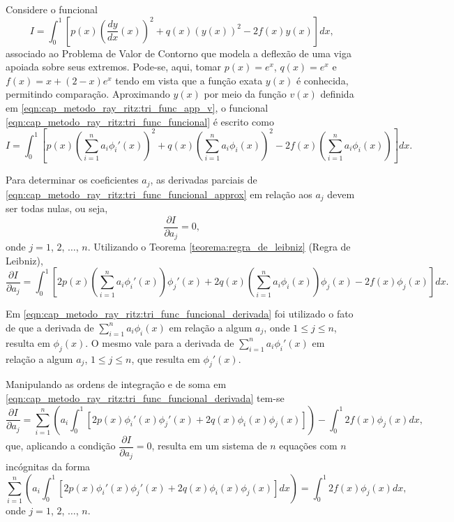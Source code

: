 \documentclass[
	12pt,				%
	openright,			%
    twoside,			%
	a4paper,			%
	english,			%
	french,				%
	spanish,			%
	brazil				%
	]{abntex2}
\numberwithin{lema}{chapter}
\numberwithin{teorema}{chapter}
\numberwithin{definicao}{chapter}
\numberwithin{exemplo}{chapter}
\numberwithin{figure}{chapter}
\begin{document}
Considere o funcional
\begin{equation}
	\label{eqn:cap_metodo_ray_ritz:tri_func_funcional}
	I = \int_{0}^{1} \left [ 
		p(x) \left ( 
			\frac{dy}{dx} (x) 
		\right )^2
		+ q(x)(y(x))^2 
		- 2f(x)y(x) 
	\right ] dx
	\text{,}
\end{equation}
associado ao Problema de Valor de Contorno que modela a deflexão de uma viga apoiada sobre seus extremos. Pode-se, aqui, tomar $p(x)=e^x$, $q(x)=e^x$ e $f(x)=x+(2-x)e^x$ tendo em vista que a função exata $y(x)$ é conhecida, permitindo comparação. Aproximando $y(x)$ por meio da função $v(x)$ definida em \eqref{eqn:cap_metodo_ray_ritz:tri_func_app_v}, o funcional \eqref{eqn:cap_metodo_ray_ritz:tri_func_funcional} é escrito como
\begin{equation}
	\label{eqn:cap_metodo_ray_ritz:tri_func_funcional_approx}
	I = \int_{0}^{1} \left [
		p(x) \left (
			\sum_{i=1}^{n} a_i \phi_i '(x)
		\right )^2
		+ q(x) \left (
			\sum_{i=1}^{n} a_i \phi_i (x)
		\right )^2
		- 2f(x) \left (
			\sum_{i=1}^{n} a_i \phi_i (x)
		\right )
	\right ] dx
	\text{.}
\end{equation}

Para determinar os coeficientes $a_j$, as derivadas parciais de \eqref{eqn:cap_metodo_ray_ritz:tri_func_funcional_approx} em relação aos $a_j$ devem ser todas nulas, ou seja,
$$
	\frac{\partial I}{\partial a_j} = 0
	\text{,}
$$
onde $j=1$, $2$, $\dots$, $n$. Utilizando o Teorema \ref{teorema:regra_de_leibniz} (Regra de Leibniz),
\begin{equation}
	\label{eqn:cap_metodo_ray_ritz:tri_func_funcional_derivada}
	\frac{\partial I}{\partial a_j} = 
	\int_{0}^{1} \left [
		2p(x) \left (
			\sum_{i=1}^{n} a_i \phi_i'(x)
		\right ) \phi_j'(x)
		+ 2q(x) \left (
			\sum_{i=1}^{n} a_i \phi_i(x)
		\right ) \phi_j(x)
		- 2f(x)\phi_j(x)
	\right ] dx
	\text{.}
\end{equation}

Em \eqref{eqn:cap_metodo_ray_ritz:tri_func_funcional_derivada} foi utilizado o fato de que a derivada de $\displaystyle \sum_{i=1}^{n} a_i \phi_i(x)$ em relação a algum $a_j$, onde $1\leqslant j\leqslant n$, resulta em $\phi_j(x)$. O mesmo vale para a derivada de $\displaystyle \sum_{i=1}^{n} a_i \phi_i'(x)$ em relação a algum $a_j$, $1\leqslant j\leqslant n$, que resulta em $\phi_j'(x)$.

Manipulando as ordens de integração e de soma em \eqref{eqn:cap_metodo_ray_ritz:tri_func_funcional_derivada} tem-se
$$
	\frac{\partial I}{\partial a_j} = \sum_{i=1}^{n} \left (
		a_i \int_{0}^{1} \left [
			2p(x)\phi_i'(x)\phi_j'(x)
			+
			2q(x)\phi_i(x)\phi_j(x)
		\right ]
	\right )
	-
	\int_{0}^{1} 2f(x)\phi_j(x)dx
	\text{,}
$$
que, aplicando a condição $\dfrac{\partial I}{\partial a_j}=0$, resulta em um sistema de $n$ equações com $n$ incógnitas da forma
\begin{equation}
	\label{eqn:cap_metodo_ray_ritz:tri_func_sistema}
	\sum_{i=1}^{n} \left (
		a_i \int_{0}^{1} \left [
			2p(x)\phi_i'(x)\phi_j'(x)
			+
			2q(x)\phi_i(x)\phi_j(x)
		\right ] dx
	\right )
	=
	\int_{0}^{1} 2f(x)\phi_j(x)dx
	\text{,}
\end{equation}
onde $j=1$, $2$, $\dots$, $n$.
\end{document}
